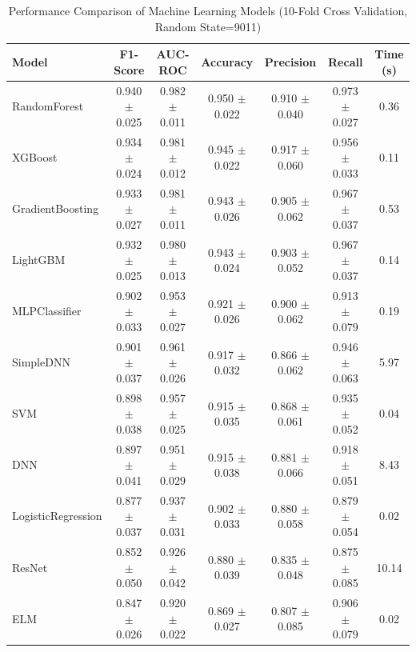 \begin{table}[htbp]
\centering
\caption{Performance Comparison of Machine Learning Models (10-Fold Cross Validation, Random State=9011)}
\label{tab:model_comparison}
\begin{tabular}{lcccccc}
\toprule
\textbf{Model} & \textbf{F1-Score} & \textbf{AUC-ROC} & \textbf{Accuracy} & \textbf{Precision} & \textbf{Recall} & \textbf{Time (s)} \\
\midrule
RandomForest & 0.940 $\pm$ 0.025 & 0.982 $\pm$ 0.011 & 0.950 $\pm$ 0.022 & 0.910 $\pm$ 0.040 & 0.973 $\pm$ 0.027 & 0.36 \\
XGBoost & 0.934 $\pm$ 0.024 & 0.981 $\pm$ 0.012 & 0.945 $\pm$ 0.022 & 0.917 $\pm$ 0.060 & 0.956 $\pm$ 0.033 & 0.11 \\
GradientBoosting & 0.933 $\pm$ 0.027 & 0.981 $\pm$ 0.011 & 0.943 $\pm$ 0.026 & 0.905 $\pm$ 0.062 & 0.967 $\pm$ 0.037 & 0.53 \\
LightGBM & 0.932 $\pm$ 0.025 & 0.980 $\pm$ 0.013 & 0.943 $\pm$ 0.024 & 0.903 $\pm$ 0.052 & 0.967 $\pm$ 0.037 & 0.14 \\
MLPClassifier & 0.902 $\pm$ 0.033 & 0.953 $\pm$ 0.027 & 0.921 $\pm$ 0.026 & 0.900 $\pm$ 0.062 & 0.913 $\pm$ 0.079 & 0.19 \\
SimpleDNN & 0.901 $\pm$ 0.037 & 0.961 $\pm$ 0.026 & 0.917 $\pm$ 0.032 & 0.866 $\pm$ 0.062 & 0.946 $\pm$ 0.063 & 5.97 \\
SVM & 0.898 $\pm$ 0.038 & 0.957 $\pm$ 0.025 & 0.915 $\pm$ 0.035 & 0.868 $\pm$ 0.061 & 0.935 $\pm$ 0.052 & 0.04 \\
DNN & 0.897 $\pm$ 0.041 & 0.951 $\pm$ 0.029 & 0.915 $\pm$ 0.038 & 0.881 $\pm$ 0.066 & 0.918 $\pm$ 0.051 & 8.43 \\
LogisticRegression & 0.877 $\pm$ 0.037 & 0.937 $\pm$ 0.031 & 0.902 $\pm$ 0.033 & 0.880 $\pm$ 0.058 & 0.879 $\pm$ 0.054 & 0.02 \\
ResNet & 0.852 $\pm$ 0.050 & 0.926 $\pm$ 0.042 & 0.880 $\pm$ 0.039 & 0.835 $\pm$ 0.048 & 0.875 $\pm$ 0.085 & 10.14 \\
ELM & 0.847 $\pm$ 0.026 & 0.920 $\pm$ 0.022 & 0.869 $\pm$ 0.027 & 0.807 $\pm$ 0.085 & 0.906 $\pm$ 0.079 & 0.02 \\
\bottomrule
\end{tabular}
\end{table}